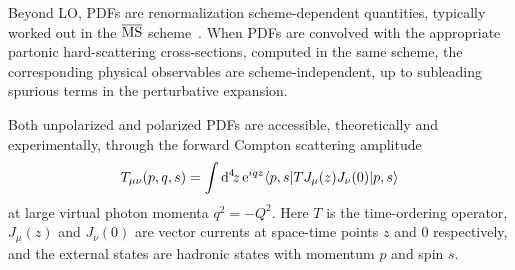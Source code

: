 Beyond LO, PDFs are renormalization scheme-dependent 
quantities, typically worked out in the $\overline{\rm MS}$ 
scheme~\cite{tHooft:1973mfk,Weinberg:1951ss}.
%
When PDFs are convolved with the appropriate partonic hard-scattering 
cross-sections, computed in the same scheme, the corresponding physical 
observables are scheme-independent, up to subleading spurious 
terms in the perturbative expansion. 

Both unpolarized and polarized PDFs are accessible, theoretically and 
experimentally, through the forward Compton scattering amplitude
\begin{equation}
\label{eq:Compton}
T_{\mu\nu}(p,q,s) 
= 
\int {\rm d}^4\!z\, {\rm e}^{iqz}  \langle p,s |T J_\mu(z) J_\nu(0)|p,s\rangle
\end{equation}
at large virtual photon momenta $q^2=-Q^2$. 
%
Here $T$ is the time-ordering operator, $J_\mu(z)$ and $J_\nu(0)$ are vector
currents at space-time points $z$ and $0$ respectively, and the 
external states are hadronic states with momentum $p$ and spin $s$.

